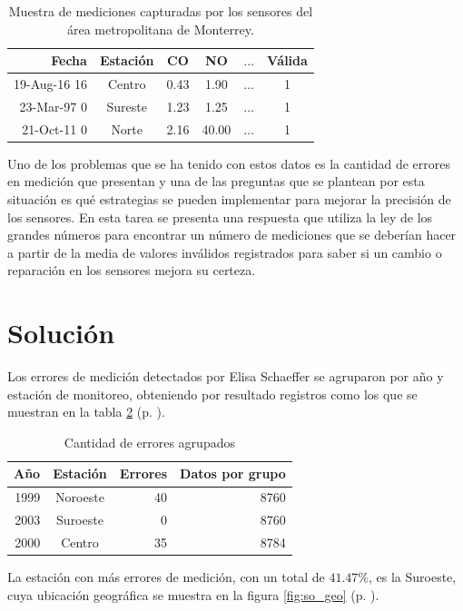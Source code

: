 \documentclass[paper=leter, fontsize=11pt]{scrartcl}
\begin{document}
\begin{table}
  \centering
  \caption{Muestra de mediciones capturadas por los sensores del área metropolitana de Monterrey.}
  \label{tabla:amm}
  \begin{tabular}{rccccc}
    \hline
  Fecha & Estación & CO & NO & $\ldots$ & Válida \\ 
    \hline
    19-Aug-16 16 & Centro & 0.43 & 1.90  & $\ldots$ & 1 \\ 
    23-Mar-97 0 & Sureste & 1.23 & 1.25  & $\ldots$ & 1 \\ 
    21-Oct-11 0 & Norte   & 2.16 & 40.00 & $\ldots$ & 1 \\ 
    \hline
  \end{tabular}
\end{table}

Uno de los problemas que se ha tenido con estos datos es la cantidad de errores en medición que presentan y una de las preguntas que se plantean por esta situación es qué estrategias se pueden implementar para mejorar la precisión de los sensores. En esta tarea se presenta una respuesta que utiliza la ley de los grandes números para encontrar un número de mediciones que se deberían hacer a partir de la media de valores inválidos registrados para saber si un cambio o reparación en los sensores mejora su certeza.

\section{Solución}

Los errores de medición detectados por Elisa Schaeffer se agruparon por año y estación de monitoreo, obteniendo por resultado registros como los que se muestran en la tabla \ref{tabla:agrupados} (p. \pageref{tabla:agrupados}).

\begin{table}[ht]
  \centering
  \caption{Cantidad de errores agrupados}
  \label{tabla:agrupados}
  \begin{tabular}{rcrr}
    \hline
    Año & Estación & Errores & Datos por grupo \\ 
    \hline
    1999 & Noroeste & 40 & 8760 \\ 
    2003 & Suroeste & 0 & 8760 \\ 
    2000 & Centro & 35 & 8784 \\ 
     \hline
  \end{tabular}
\end{table}

La estación con más errores de medición, con un total de $41.47\%$, es la Suroeste, cuya ubicación geográfica se muestra en la figura \ref{fig:so_geo} (p. \pageref{fig:so_geo}).
\end{document}

